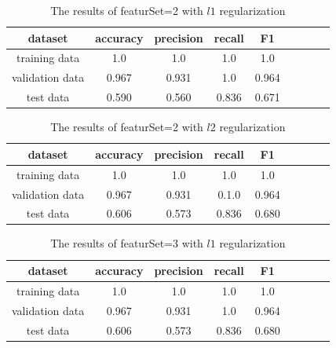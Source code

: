 \begin{table}[!h]
  \begin{center}
  \begin{tabular}{|c|c|c|c|c|c|c|c|c|} \hline
    dataset & accuracy & precision & recall & F1 \\ \hline
    training data & 1.0 & 1.0 & 1.0 & 1.0 \\ \hline
    validation data & 0.967 & 0.931 & 1.0 & 0.964 \\ \hline
    test data & 0.590 & 0.560 & 0.836 & 0.671 \\ \hline
  \end{tabular}
  \caption{The results of featurSet=2 with $l1$ regularization}
  \label{tab:result_2_l1}
  \end{center}
\end{table}

\begin{table}[!h]
  \begin{center}
  \begin{tabular}{|c|c|c|c|c|c|c|c|c|} \hline
    dataset & accuracy & precision & recall & F1 \\ \hline
    training data & 1.0 & 1.0 & 1.0 & 1.0 \\ \hline
    validation data & 0.967 & 0.931 & 0.1.0 & 0.964 \\ \hline
    test data & 0.606 & 0.573 & 0.836 & 0.680 \\ \hline
  \end{tabular}
  \caption{The results of featurSet=2 with $l2$ regularization}
  \label{tab:result_2_l2}
  \end{center}
\end{table}

\begin{table}[!h]
  \begin{center}
  \begin{tabular}{|c|c|c|c|c|c|c|c|c|} \hline
    dataset & accuracy & precision & recall & F1 \\ \hline
    training data & 1.0 & 1.0 & 1.0 & 1.0 \\ \hline
    validation data & 0.967 & 0.931 & 1.0 & 0.964 \\ \hline
    test data & 0.606 & 0.573 & 0.836 & 0.680 \\ \hline
  \end{tabular}
  \caption{The results of featurSet=3 with $l1$ regularization}
  \label{tab:result_3_l1}
  \end{center}
\end{table}

